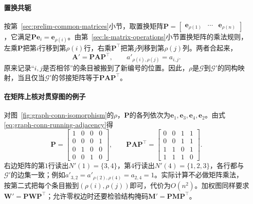\paragraph{置换共轭}
按第~\ref{sec:prelim-common-matrices}小节，取置换矩阵$\bm P=\begin{bmatrix}\bm e_{\rho(1)}&\cdots&\bm e_{\rho(n)}\end{bmatrix}$，它满足$\bm P\bm e_i=\bm e_{\rho(i)}$。由第~\ref{sec:ls-matrix-operations}小节置换矩阵的乘法规则，左乘$\bm P$把第$i$行移到第$\rho(i)$行，右乘$\bm P^{\top}$把第$j$列移到第$\rho(j)$列。两者合起来，
\begin{equation}
\bm A'=\bm P\bm A\bm P^{\top},\qquad
a'_{\rho(i),\rho(j)}=a_{i,j}.
\label{eq:graph-conn-relabel}
\end{equation}
原来记录“$i,j$是否相邻”的条目被搬到了新编号的位置。因此，$\rho$是$\mathcal G$到$\mathcal G'$的同构映射，当且仅当$\mathcal G'$的邻接矩阵等于$\bm P\bm A\bm P^{\top}$。

\paragraph{在矩阵上核对贯穿图的例子}
对图~\ref{fig:graph-conn-isomorphism}的$\rho$，$\bm P$的各列依次为$\bm e_1,\bm e_3,\bm e_4,\bm e_2$。由式\eqref{eq:graph-conn-running-adjacency}得
\[
\bm P=
\begin{bmatrix}
1&0&0&0\\
0&0&0&1\\
0&1&0&0\\
0&0&1&0
\end{bmatrix},\qquad
\bm P\bm A\bm P^{\top}=
\begin{bmatrix}
0&0&1&1\\
0&0&1&1\\
1&1&0&1\\
1&1&1&0
\end{bmatrix}.
\]
右边矩阵的第$1$行读出$N'(1)=\{3,4\}$，第$4$行读出$N'(4)=\{1,2,3\}$，各行都与$\mathcal G'$的边集一致；例如$a'_{3,2}=a'_{\rho(2),\rho(4)}=a_{2,4}=1$。实际计算不必做矩阵乘法，按第二式把每个条目搬到$(\rho(i),\rho(j))$即可，代价为$O(n^2)$。加权图同样要求$\bm W'=\bm P\bm W\bm P^{\top}$；允许零权边时还要检验结构掩码$\bm M'=\bm P\bm M\bm P^{\top}$。

